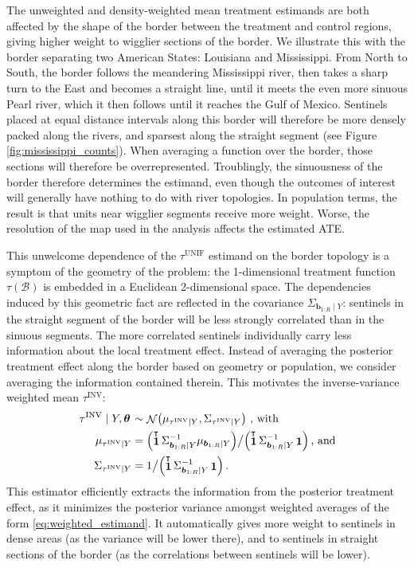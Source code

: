\documentclass[letter,12pt]{article}
\DeclarePairedDelimiter{\parenthesis}{\lparen}{\rparen}
\newcommand{\del}[1]{\parenthesis*{#1}}
\DeclareMathOperator{\normal}{\mathcal{N}}
\DeclareMathOperator{\ones}{\mathbf{1}}
\newcommand*{\trans}{^{\mkern-1.5mu\intercal}}
\newcommand{\border}{\mathcal{B}}
\newcommand{\sentinel}{\bm{b}}
\newcommand{\numsent}{R}
\newcommand{\sentinels}{\sentinel_{1:\numsent}}
\newcommand{\unifavg}{\tau^{\mathrm{UNIF}}}
\newcommand{\invvar}{\tau^{\mathrm{INV}}}
\newcommand{\eqlabel}[1]{\label{#1}}
\newcommand{\hyperparam}{\bm{\theta}}
\begin{document}
The unweighted and density-weighted mean treatment estimands are both affected by the shape of the border between the treatment and control regions,
giving higher weight to wigglier sections of the border.
We illustrate this with the border separating two American States: Louisiana and Mississippi.
From North to South, the border follows the meandering Mississippi river, then takes a sharp turn to the East and becomes a straight line, until it meets the even more sinuous Pearl river, which it then follows until it reaches the Gulf of Mexico.
Sentinels placed at equal distance intervals along this border will therefore be more densely packed along the rivers, and sparsest along the straight segment (see Figure \ref{fig:mississippi_counts}).
When averaging a function over the border, those sections will therefore be overrepresented.
Troublingly, the sinuousness of the border therefore determines the estimand, even though the outcomes of interest will generally have nothing to do with river topologies.
In population terms, the result is that units near wigglier segments receive more weight.
Worse, the resolution of the map used in the analysis affects the estimated ATE.

This unwelcome dependence of the \(\unifavg\) estimand on the border topology is a symptom of the geometry of the problem: the 1-dimensional treatment function \(\tau(\border)\) is embedded in a Euclidean 2-dimensional space.
The dependencies induced by this geometric fact are reflected in the covariance \(\Sigma_{\sentinels \mid Y}\): sentinels in the straight segment of the border will be less strongly correlated than in the sinuous segments.
The more correlated sentinels individually carry less information about the local treatment effect.
Instead of averaging the posterior treatment effect along the border based on geometry or population, we consider averaging the information contained therein.
This motivates the inverse-variance weighted mean \(\invvar\):
\begin{equation}
    \begin{split}
        \left. \invvar \mid Y, \hyperparam \right. &\sim \normal\del{\mu_{\invvar \mid Y}, \Sigma_{\invvar \mid Y}} ~ \text{, with} \\
        \mu_{\invvar \mid Y} &= \del{\ones\trans \Sigma_{\sentinels \mid Y}^{-1} \mu_{\sentinels \mid Y}} \big/ \del{\ones\trans \Sigma_{\sentinels \mid Y}^{-1} \ones} \,\textrm{, and} \\
        \Sigma_{\invvar \mid Y} &= 1 \big/ \del{\ones\trans \Sigma_{\sentinels \mid Y}^{-1} \ones} \,.
    \end{split}
    \eqlabel{eq:invvar}
\end{equation}
This estimator efficiently extracts the information from the posterior treatment effect, as it minimizes the posterior variance amongst weighted averages of the form \eqref{eq:weighted_estimand}.
It automatically gives more weight to sentinels in dense areas (as the variance will be lower there), and to sentinels in straight sections of the border (as the correlations between sentinels will be lower).
\end{document}

